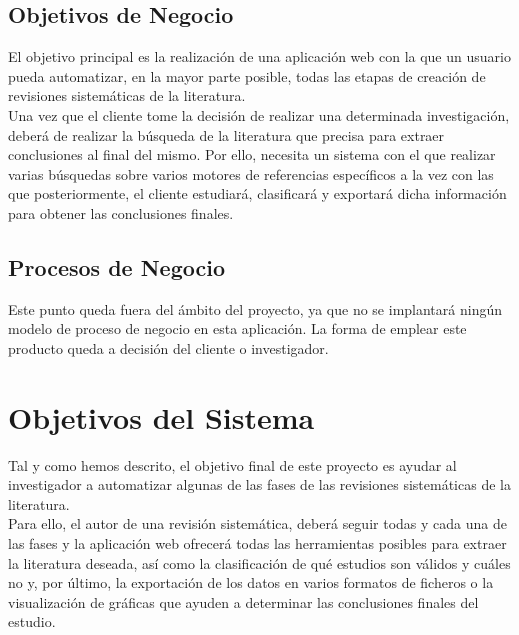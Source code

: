 \subsection{Objetivos de Negocio}
El objetivo principal es la realización de una aplicación web con la que un usuario pueda automatizar, en la mayor parte posible, todas las etapas de creación de revisiones sistemáticas de la literatura.\\

Una vez que el cliente tome la decisión de realizar una determinada investigación, deberá de realizar la búsqueda de la literatura que precisa para extraer conclusiones al final del mismo. Por ello, necesita un sistema con el que realizar varias búsquedas sobre varios motores de referencias específicos a la vez con las que posteriormente, el cliente estudiará, clasificará y exportará dicha información para obtener las conclusiones finales.\\

\subsection{Procesos de Negocio}
Este punto queda fuera del ámbito del proyecto, ya que no se implantará ningún modelo de proceso de negocio en esta aplicación. La forma de emplear este producto queda a decisión del cliente o investigador.

\section{Objetivos del Sistema}
Tal y como hemos descrito, el objetivo final de este proyecto es ayudar al investigador a automatizar algunas de las fases de las revisiones sistemáticas de la literatura.\\

Para ello, el autor de una revisión sistemática, deberá seguir todas y cada una de las fases y la aplicación web ofrecerá todas las herramientas posibles para extraer la literatura deseada, así como la clasificación de qué estudios son válidos y cuáles no y, por último, la exportación de los datos en varios formatos de ficheros o la visualización de gráficas que ayuden a determinar las conclusiones finales del estudio.\\

